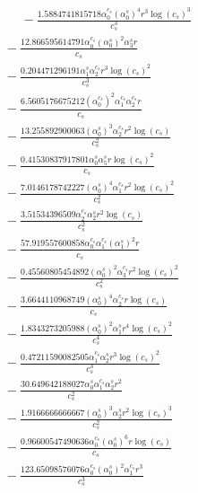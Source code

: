 \documentclass[10pt]{article}
\begin{document}
\begin{align*}
\phantom{R_{3,8}} &\phantom{={}}{}  - \frac{1.5884741815718 \alpha_{0}^{c_s} \left(\alpha_{0}^s\right)^{4} r^{3} \log{\left(c_{s} \right)}^{3}}{c_{s}^{3}} \\
&{}  - \frac{12.866595614791 \alpha_{0}^{c_s} \left(\alpha_{0}^s\right)^{2} \alpha_{3}^s r}{c_{s}} \\
&{}  - \frac{0.204471296191 \alpha_{1}^s \alpha_{2}^{c_s} r^{3} \log{\left(c_{s} \right)}^{2}}{c_{s}^{3}} \\
&{}  - \frac{6.5605176675212 \left(\alpha_{0}^{c_s}\right)^{2} \alpha_{1}^{c_s} \alpha_{2}^{c_s} r}{c_{s}} \\
&{}  - \frac{13.255892900063 \left(\alpha_{0}^s\right)^{3} \alpha_{2}^{c_s} r^{2} \log{\left(c_{s} \right)}}{c_{s}^{2}} \\
&{}  - \frac{0.41530837917801 \alpha_{0}^s \alpha_{5}^s r \log{\left(c_{s} \right)}^{2}}{c_{s}} \\
&{}  - \frac{7.0146178742227 \left(\alpha_{0}^s\right)^{4} \alpha_{1}^{c_s} r^{2} \log{\left(c_{s} \right)}^{2}}{c_{s}^{2}} \\
&{}  - \frac{3.51534396509 \alpha_{2}^{c_s} \alpha_{2}^s r^{2} \log{\left(c_{s} \right)}}{c_{s}^{2}} \\
&{}  - \frac{57.919557600858 \alpha_{0}^{c_s} \alpha_{1}^{c_s} \left(\alpha_{1}^s\right)^{2} r}{c_{s}} \\
&{}  - \frac{0.45560805454892 \left(\alpha_{0}^s\right)^{2} \alpha_{3}^{c_s} r^{2} \log{\left(c_{s} \right)}^{2}}{c_{s}^{2}} \\
&{}  - \frac{3.6644110968749 \left(\alpha_{0}^s\right)^{4} \alpha_{2}^{c_s} r \log{\left(c_{s} \right)}}{c_{s}} \\
&{}  - \frac{1.8343273205988 \left(\alpha_{0}^s\right)^{2} \alpha_{1}^s r^{4} \log{\left(c_{s} \right)}^{2}}{c_{s}^{4}} \\
&{}  - \frac{0.47211590082505 \alpha_{1}^{c_s} \alpha_{2}^s r^{3} \log{\left(c_{s} \right)}^{2}}{c_{s}^{3}} \\
&{}  - \frac{30.649642188027 \alpha_{0}^s \alpha_{1}^{c_s} \alpha_{2}^s r^{2}}{c_{s}^{2}} \\
&{}  - \frac{1.9166666666667 \left(\alpha_{0}^s\right)^{3} \alpha_{2}^s r^{2} \log{\left(c_{s} \right)}^{3}}{c_{s}^{2}} \\
&{}  - \frac{0.96600547490636 \alpha_{0}^{c_s} \left(\alpha_{0}^s\right)^{6} r \log{\left(c_{s} \right)}}{c_{s}} \\
&{}  - \frac{123.65098576076 \alpha_{0}^{c_s} \left(\alpha_{0}^s\right)^{2} \alpha_{1}^{c_s} r^{3}}{c_{s}^{3}} \\

\end{align*}
\end{document}
